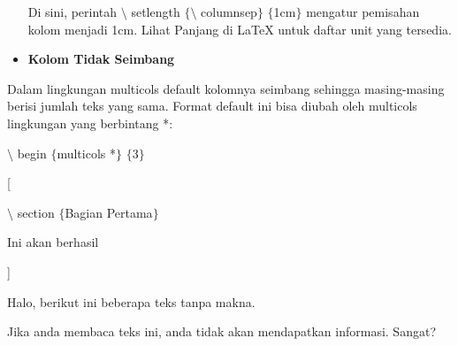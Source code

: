 \begin{itemize}
Di sini, perintah $\setminus$ setlength $ \{ $$\setminus$ columnsep$ \} $ $ \{ $1cm$ \} $ mengatur pemisahan kolom menjadi 1cm. Lihat Panjang di LaTeX untuk daftar unit yang tersedia.\par
\vspace{\baselineskip}
\vspace{\baselineskip}
\vspace{12pt}
\vspace{12pt}
	\item {\fontsize{14pt}{14pt}\selectfont \textbf{Kolom Tidak Seimbang}}
\end{itemize}\par
\vspace{\baselineskip}
\noindent Dalam lingkungan multicols default kolomnya seimbang sehingga masing-masing berisi jumlah teks yang sama. Format default ini bisa diubah oleh multicols lingkungan yang berbintang *:\par

\vspace{\baselineskip}
\noindent \hspace*{0.5in}$\setminus$ begin $ \{ $multicols *$ \} $ $ \{ $3$ \} $\par

\vspace{\baselineskip}
\noindent \hspace*{0.5in}[\par

\noindent \hspace*{0.5in}\hspace*{0.5in}$\setminus$ section $ \{ $Bagian Pertama$ \} $\par


\noindent \hspace*{0.5in}\hspace*{0.5in}Ini akan berhasil\par

\vspace{\baselineskip}
\noindent \hspace*{0.5in}]\par

\vspace{\baselineskip}
\noindent \hspace*{0.5in}\hspace*{0.5in}Halo, berikut ini beberapa teks tanpa makna. \par

\vspace{\baselineskip}
Jika anda membaca teks ini, anda tidak akan mendapatkan informasi. Sangat? \par

